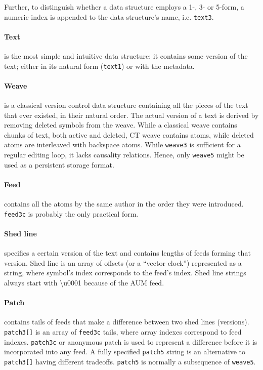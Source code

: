 \documentclass[twocolumn]{article}
\begin{document}
Further, to distinguish whether a data structure employs a 1-, 3- or 5-form, a numeric index is appended to the data structure's name, i.e. {\tt text3}.

\paragraph{Text} is the most simple and intuitive data structure: it contains some version of the text; either in its natural form ({\tt text1}) or with the metadata.
\paragraph{Weave} is a classical version control data structure containing all the pieces of the
   text that ever existed, in their natural order. The actual version
   of a text is derived by removing deleted symbols from the weave.
   While a classical weave contains chunks of text, both active and
   deleted, CT weave contains atoms, while deleted atoms are interleaved
   with backspace atoms.
   While {\tt weave3} is sufficient for a regular editing loop, 
   it lacks causality relations. Hence, only {\tt weave5} might
   be used as a persistent storage format.
\paragraph{Feed} contains all the atoms by the same author in the order they were introduced. {\tt feed3c} is probably the only practical form.
\paragraph{Shed line} specifies a certain version of the text and contains lengths of feeds forming that version. Shed line is an array of offsets (or a ``vector clock'') represented as a string, where symbol's index corresponds to the feed's index. Shed line strings always start with \textbackslash u0001 because of the AUM feed.
\paragraph{Patch} contains tails of feeds that make a difference between two shed lines (versions). {\tt patch3[]} is an array of {\tt feed3c} tails, where array indexes correspond to feed indexes. {\tt patch3c} or anonymous patch is used to represent a difference before it is incorporated into any feed. A fully specified {\tt patch5} string is an alternative to {\tt patch3[]} having different tradeoffs.
{\tt patch5} is normally a subsequence of {\tt weave5}.
\end{document}
